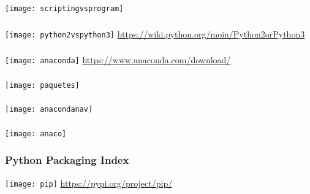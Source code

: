 \documentclass[12pt]{beamer}
\begin{document}
\begin{frame}
\frametitle{}
\centering
	\texttt{[image: scriptingvsprogram]} 
\end{frame}
\begin{frame}
\frametitle{}
\centering
	\texttt{[image: python2vspython3]}
\vfill
\url{https://wiki.python.org/moin/Python2orPython3}
\end{frame}
\begin{frame}
\frametitle{}
\centering
	\texttt{[image: anaconda]}
\vfill
\url{https://www.anaconda.com/download/}
\end{frame}
\begin{frame}
\frametitle{}
\centering
	\texttt{[image: paquetes]}
\end{frame}
\begin{frame}
\frametitle{}
\centering
	\texttt{[image: anacondanav]}
\end{frame}
\begin{frame}
\frametitle{}
\centering
	\texttt{[image: anaco]}
\end{frame}
\begin{frame}
 \begin{center}
    \end{center}
\end{frame}
\begin{frame}
\frametitle{Python Packaging Index}
\centering
	\texttt{[image: pip]}
\vfill
\url{https://pypi.org/project/pip/}
\end{frame}
\end{document}
